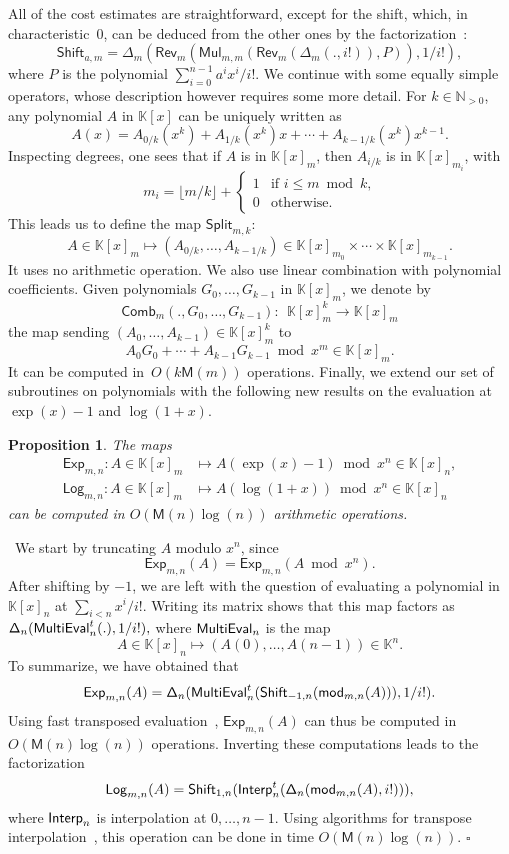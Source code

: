 \documentclass{sig-alternate}
\def\N {\mathbb{N}}
\def\K {\ensuremath{\mathbb{K}}}
\def\M{\ensuremath{\mathsf{M}}}
\def\mymod {\ensuremath{\mathsf{mod}}}
\def\Lg {\ensuremath{\mathsf{Log}}}
\def\Xp {\ensuremath{\mathsf{Exp}}}
\def\Shift {\ensuremath{\mathsf{Shift}}}
\def\Root {\ensuremath{\mathsf{Split}}}
\def\LinComb {\ensuremath{\mathsf{Comb}}}
\def\Diag{\ensuremath{\mathsf{\Delta}}}
\def\Rev {\ensuremath{\mathsf{Rev}}}
\def\mul {\ensuremath{\mathsf{Mul}}}
\def\myproof{\noindent{\sc Proof.}~}
\def\foorp{\hfill$\square$}
\newtheorem{Prop}{Proposition}
\begin{document}
\noindent All of the cost estimates are straightforward, except for
the shift, which, in characteristic~0, can be deduced from the other
ones by the factorization~\cite{AhStUl75}:
\[\Shift_{a,m}=\Diag_m(\Rev_m(\mul_{m,m}(\Rev_m(\Diag_m(.,i!)),P)),1/i!),\]
where $P$ is the polynomial $\sum_{i=0}^{n-1} a^i x^i/i!$.
We continue with some equally simple operators, whose description
however requires some more detail. For $k \in \N_{>0}$, any polynomial $A$
in $\K[x]$ can be uniquely written as
$$A(x)=A_{0/k}(x^k) + A_{1/k}(x^k)x + \cdots + A_{k-1/k}(x^k) x^{k-1}.$$
Inspecting degrees, one sees that if $A$ is in $\K[x]_m$, then $A_{i/k}$ is in $\K[x]_{m_i}$, with    
\begin{equation}\label{eq:ni}
m_i=\lfloor{m/k}\rfloor+\begin{cases}1&\text{if $i\le m \bmod k$,}\\
0&\text{otherwise.}\end{cases}
\end{equation}
This leads us to define the map $\Root_{m,k}:$ 
$$ A \in \K[x]_m \mapsto (A_{0/k},\dots,A_{k-1/k}) \in \K[x]_{m_0}
\times \cdots \times \K[x]_{m_{k-1}}.$$ It uses no arithmetic operation.
We also use linear combination with polynomial coefficients.
Given polynomials $G_0,\dots,G_{k-1}$ in $\K[x]_m$, we
denote by
$$\LinComb_{m}(.,G_0,\dots,G_{k-1}):\ \  \K[x]_m^k \to \K[x]_m$$ the map sending
$(A_0,\dots,A_{k-1}) \in \K[x]_m^k$ to
$$A_0 G_0 + \cdots + A_{k-1} G_{k-1} \bmod x^{m} \in \K[x]_m.$$
It can be computed in~$O(k\M(m))$ operations.
Finally, we extend our set of subroutines on polynomials with the
following new results on the evaluation at $\exp(x)-1$ and $\log(1+x)$.
\begin{Prop}\label{Prop:xp} The maps
\begin{align*}
\Xp_{m,n}: A \in \K[x]_m &\mapsto A(\exp(x)-1) \bmod x^n \in \K[x]_{n},\\
\Lg_{m,n}: A \in \K[x]_m &\mapsto A(\log(1+x)) \bmod x^n \in \K[x]_{n}
\end{align*}
can be computed in $O(\M(n)\log(n))$ arithmetic operations.  
\end{Prop}
\myproof We start by truncating $A$ modulo $x^n$, since
$$\Xp_{m,n}(A) = \Xp_{m,n}(A \bmod x^n).$$ After shifting by $-1$, we
are left with the question of evaluating a polynomial in $\K[x]_n$ at
$\sum_{i < n} x^i/i!$. Writing its matrix shows that this map factors
as $\Diag_n({\sf MultiEval}^t_n(.),1/i!),$ where ${\sf MultiEval}_n$
is the map
$$A \in \K[x]_n \mapsto (A(0),\dots,A(n-1))\in \K^n.$$ To summarize,
we have obtained that
$$\Xp_{m,n}(A) = \Diag_n({\sf
MultiEval}^t_n(\Shift_{-1,n}(\mymod_{m,n}(A))),1/i!).$$ Using fast
transposed evaluation~\cite{CaKaLa89,BoLeSc03}, $\Xp_{m,n}(A)$ can
thus be computed in $O(\M(n)\log(n))$ operations.  Inverting these
computations leads to the factorization
$$\Lg_{m,n}(A) = \Shift_{1,n}({\sf
Interp}^t_n(\Diag_n(\mymod_{m,n}(A),i!))),$$ where ${\sf Interp}_n$
is interpolation at $0,\dots,n-1$. Using algorithms for transpose
interpolation~\cite{KaLa88,BoLeSc03}, this operation can be done in
time $O(\M(n)\log(n))$.  \foorp
\end{document}
